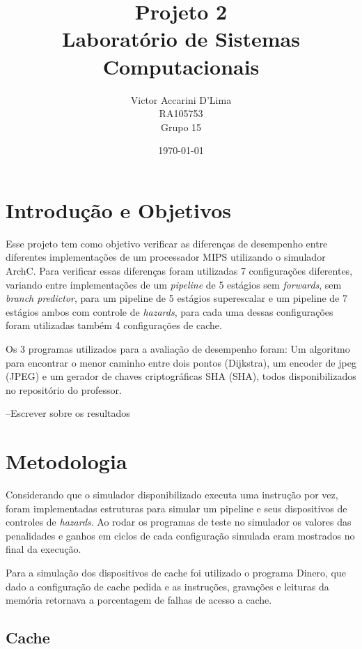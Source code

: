 \documentclass[pdftex,12pt,a4paper]{article}
\begin{document}
\title{Projeto 2\\Laboratório de Sistemas Computacionais}
\author{Victor Accarini D'Lima\\RA105753\\Grupo 15}
\date{\today}
\maketitle

\bigskip

\section{Introdução e Objetivos}

Esse projeto tem como objetivo verificar as diferenças de desempenho entre 
diferentes implementações de um processador MIPS utilizando o simulador ArchC. 
Para verificar essas diferenças foram utilizadas 7 configurações diferentes, 
variando entre implementações de um \textit{pipeline} de 5 estágios sem 
\textit{forwards}, sem \textit{branch predictor}, para um pipeline de 5 estágios 
superescalar e um pipeline de 7 estágios ambos com controle de \textit{hazards}, 
para cada uma dessas configurações foram utilizadas também 4 configurações de cache.

Os 3 programas utilizados para a avaliação de desempenho foram: Um algoritmo para 
encontrar o menor caminho entre dois pontos (Dijkstra), um encoder de jpeg (JPEG) e um 
gerador de chaves criptográficas SHA (SHA), todos disponibilizados no repositório do 
professor.

--Escrever sobre os resultados

\section{Metodologia}

Considerando que o simulador disponibilizado executa uma instrução por vez, 
foram implementadas estruturas para simular um pipeline e seus dispositivos 
de controles de \textit{hazards}. Ao rodar os programas de teste no simulador 
os valores das penalidades e ganhos em ciclos de cada configuração simulada 
eram mostrados no final da execução.

Para a simulação dos dispositivos de cache foi utilizado o programa Dinero, 
que dado a configuração de cache pedida e as instruções, gravações e leituras 
da memória retornava a porcentagem de falhas de acesso a cache.

\subsection{Cache}
\end{document}
